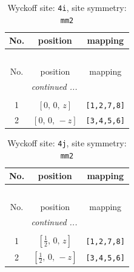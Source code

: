 \documentclass[fleqn,8pt]{jsarticle}
\begin{document}
\renewcommand{\arraystretch}{1.2}
\begin{longtable}{ccc}
\caption{Wyckoff site: {\tt 4i}, site symmetry: {\tt mm2}}
 \\
 \hline \hline
No. & position & mapping \\ \hline \endfirsthead

\multicolumn{2}{l}{\tablename\ \thetable{}} \\
 \hline \hline
No. & position & mapping \\ \hline \endhead

 \hline \hline
\multicolumn{2}{r}{\footnotesize\it continued ...} \\ \endfoot

 \hline \hline
\multicolumn{2}{r}{} \\ \endlastfoot

1 & $\left[ 0,\, 0,\, z \right]$ & {\tt [1,2,7,8]} \\ \hline
2 & $\left[ 0,\, 0,\, - z \right]$ & {\tt [3,4,5,6]} \\
\end{longtable}
\renewcommand{\arraystretch}{1.2}
\begin{longtable}{ccc}
\caption{Wyckoff site: {\tt 4j}, site symmetry: {\tt mm2}}
 \\
 \hline \hline
No. & position & mapping \\ \hline \endfirsthead

\multicolumn{2}{l}{\tablename\ \thetable{}} \\
 \hline \hline
No. & position & mapping \\ \hline \endhead

 \hline \hline
\multicolumn{2}{r}{\footnotesize\it continued ...} \\ \endfoot

 \hline \hline
\multicolumn{2}{r}{} \\ \endlastfoot

1 & $\left[ \frac{1}{2},\, 0,\, z \right]$ & {\tt [1,2,7,8]} \\ \hline
2 & $\left[ \frac{1}{2},\, 0,\, - z \right]$ & {\tt [3,4,5,6]} \\
\end{longtable}
\renewcommand{\arraystretch}{1.2}
\end{document}
